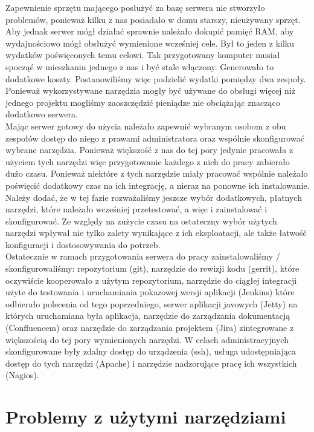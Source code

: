 \documentclass[licencjacka]{pracamgr}
\begin{document}
Zapewnienie sprzętu mającego posłużyć za bazę serwera nie stworzyło problemów, ponieważ kilku z nas posiadało w domu starszy, nieużywany sprzęt. Aby jednak serwer mógł działać sprawnie należało dokupić pamięć RAM, aby wydajnościowo mógł obsłużyć wymienione wcześniej cele. Był to jeden z kilku wydatków poświęconych temu celowi. Tak przygotowany komputer musiał spocząć w mieszkaniu jednego z nas i być stale włączony. Generowało to dodatkowe koszty. Postanowiliśmy więc podzielić wydatki pomiędzy dwa zespoły. Ponieważ wykorzystywane narzędzia mogły być używane do obsługi więcej niż jednego projektu mogliśmy zaoszczędzić pieniądze nie obciążając znacząco dodatkowo serwera. \\

Mając serwer gotowy do użycia należało zapewnić wybranym osobom z obu zespołów dostęp do niego z prawami administratora oraz wspólnie skonfigurować wybrane narzędzia. Ponieważ większość z nas do tej pory jedynie pracowała z użyciem tych narzędzi więc przygotowanie każdego z nich do pracy zabierało dużo czasu. Ponieważ niektóre z tych narzędzie miały pracować wspólnie należało poświęcić dodatkowy czas na ich integrację, a nieraz na ponowne ich instalowanie. Należy dodać, że w tej fazie rozważaliśmy jeszcze wybór dodatkowych, płatnych narzędzi, które należało wcześniej przetestować, a więc i zainstalować i skonfigurować. Ze względy na zużycie czasu na ostateczny wybór użytych narzędzi wpływał nie tylko zalety wynikające z ich eksploatacji, ale także łatwość konfiguracji i dostosowywania do potrzeb. \\

Ostatecznie w ramach przygotowania serwera do pracy zainstalowaliśmy / skonfigurowaliśmy: repozytorium (git), narzędzie do rewizji kodu (gerrit), które oczywiście kooperowało z użytym repozytorium, narzędzie do ciągłej integracji użyte do testowania i uruchamiania pokazowej wersji aplikacji (Jenkins) które odbierało polecenia od tego poprzedniego, serwer aplikacji javowych (Jetty) na których uruchamiana była aplikacja, narzędzie do zarządzania dokumentacją (Confluencem) oraz narzędzie do zarządzania projektem (Jira) zintegrowane z większością do tej pory wymienionych narzędzi. W celach administracyjnych skonfigurowane były zdalny dostęp do urządzenia (ssh), usługa udostępniająca dostęp do tych narzędzi (Apache) i narzędzie nadzorujące pracę ich wszystkich (Nagios).

\section{Problemy z użytymi narzędziami}
\end{document}
